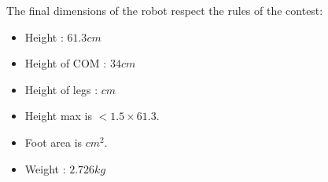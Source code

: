 The final dimensions of the robot respect the rules of the contest:
\begin{itemize}
\item Height : $61.3cm$
\item Height of COM : $34cm$
\item Height of legs : $cm$
\item Height max is $< 1.5 \times 61.3$.
\item Foot area is $ cm^2$.
\item Weight : $2.726kg$
\end{itemize}